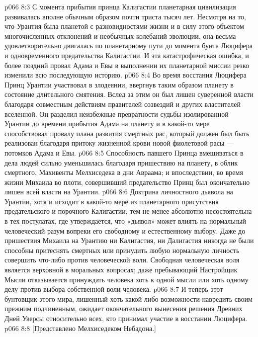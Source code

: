 \vs p066 8:3 \pc С момента прибытия принца Калигастии планетарная цивилизация развивалась вполне обычным образом почти триста тысяч лет. Несмотря на то, что Урантия была планетой с разновидностями жизни и в силу этого объектом многочисленных отклонений и необычных колебаний эволюции, она весьма удовлетворительно двигалась по планетарному пути до момента бунта Люцифера и одновременного предательства Калигастии. И эта катастрофическая ошибка, и более поздний провал Адама и Евы в выполнении их планетарной миссии резко изменили всю последующую историю.
\vs p066 8:4 Во время восстания Люцифера Принц Урантии участвовал в злодеянии, ввергнув таким образом планету в состояние длительного смятения. Вслед за этим он был лишен суверенной власти благодаря совместным действиям правителей созвездий и других властителей вселенной. Он разделил неизбежные превратности судьбы изолированной Урантии до времени прибытия Адама на планету и в какой\hyp{}то мере способствовал провалу плана развития смертных рас, который должен был быть реализован благодаря притоку жизненной крови новой фиолетовой расы --- потомков Адама и Евы.
\vs p066 8:5 Способность павшего Принца вмешиваться в дела людей сильно уменьшилась благодаря пришествию на планету, в облик смертного, Махивенты Мелхиседека в дни Авраама; и впоследствии, во время жизни Михаила во плоти, совершивший предательство Принц был окончательно лишен всей власти на Урантии.
\vs p066 8:6 \pc Доктрина личностного дьявола на Урантии, хотя и исходит в какой\hyp{}то мере из планетарного присутствия предательского и порочного Калигастии, тем не менее абсолютно несостоятельна в тех постулатах, где утверждается, что «дьявол» может влиять на нормальный человеческий разум вопреки его свободному и естественному выбору. Даже до пришествия Михаила на Урантию ни Калигастия, ни Далигастия никогда не были способны притеснять смертных или принудить любую нормальную личность совершить что\hyp{}либо против человеческой воли. Свободная человеческая воля является верховной в моральных вопросах; даже пребывающий Настройщик Мысли отказывается принуждать человека хоть к одной мысли или хоть одному делу против выбора собственной воли человека.
\vs p066 8:7 И теперь этот бунтовщик этого мира, лишенный хоть какой\hyp{}либо возможности навредить своим прежним подчиненным, ожидает окончательного вынесения решения Древних Дней Уверсы относительно всех, кто принимал участие в восстании Люцифера.
\vsetoff
\vs p066 8:8 [Представлено Мелхиседеком Небадона.]
